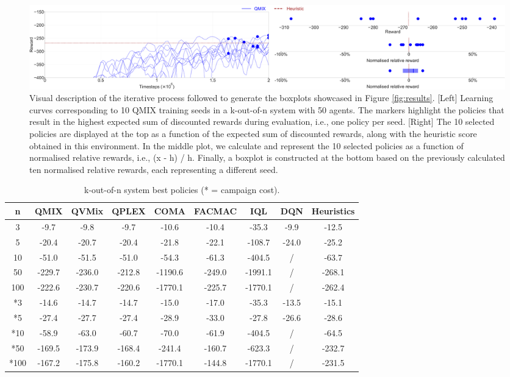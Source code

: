 \begin{figure}
    \centering
    \includegraphics[width=\textwidth]{tex_thesis/figures/ch5/plot_explain_plot_gaussian.pdf}
    \caption{Visual description of the iterative process followed to generate the boxplots showcased in Figure \ref{fig:results}.
[Left] Learning curves corresponding to 10 QMIX training seeds in a k-out-of-n system with 50 agents. 
The markers highlight the policies that result in the highest expected sum of discounted rewards during evaluation, i.e., one policy per seed.
[Right] The 10 selected policies are displayed at the top as a function of the expected sum of discounted rewards, along with the heuristic score obtained in this environment.
In the middle plot, we calculate and represent the 10 selected policies as a function of normalised relative rewards, i.e., (x - h) / h.
Finally, a boxplot is constructed at the bottom based on the previously calculated ten normalised relative rewards, each representing a different seed.
}
\label{fig:explain_fig}
\end{figure}

\newpage
\begin{table}
\centering
\caption{k-out-of-n system best policies (* = campaign cost).}
\label{tab:koutofnresults}
\begin{tabular}{c|ccccccc|c}
\toprule
n & QMIX & QVMix & QPLEX & COMA & FACMAC & IQL & DQN & Heuristics \\
\midrule
3 & -9.7 & -9.8 & -9.7 & -10.6 & -10.4 & -35.3 & -9.9 & -12.5 \\
5 & -20.4 & -20.7 & -20.4 & -21.8 & -22.1 & -108.7 & -24.0 & -25.2 \\
10 & -51.0 & -51.5 & -51.0 & -54.3 & -61.3 & -404.5 & / & -63.7 \\
50 & -229.7 & -236.0 & -212.8 & -1190.6 & -249.0 & -1991.1 & / & -268.1 \\
100 & -222.6 & -230.7 & -220.6 & -1770.1 & -225.7 & -1770.1 & / & -262.4 \\
\midrule
*3 & -14.6 & -14.7 & -14.7 & -15.0 & -17.0 & -35.3 & -13.5 & -15.1 \\
*5 & -27.4 & -27.7 & -27.4 & -28.9 & -33.0 & -27.8 & -26.6 & -28.6 \\
*10 & -58.9 & -63.0 & -60.7 & -70.0 & -61.9 & -404.5 & / & -64.5 \\
*50 & -169.5 & -173.9 & -168.4 & -241.4 & -160.7 & -623.3 & / & -232.7 \\
*100 & -167.2 & -175.8 & -160.2 & -1770.1 & -144.8 & -1770.1 & / & -231.5 \\
\bottomrule
\end{tabular}
\end{table}



